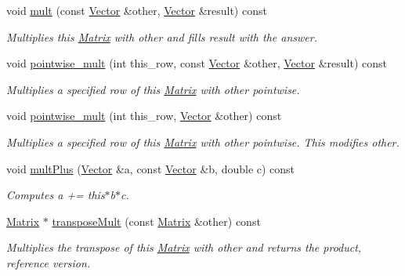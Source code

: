 \begin{DoxyCompactItemize}
void \hyperlink{class_c_a_r_o_m_1_1_matrix_acc2c71fe7bf5f24bb6825aebe07bb0b9}{mult} (const \hyperlink{class_c_a_r_o_m_1_1_vector}{Vector} \&other, \hyperlink{class_c_a_r_o_m_1_1_vector}{Vector} \&result) const 
\begin{DoxyCompactList}\small\item\em Multiplies this \hyperlink{class_c_a_r_o_m_1_1_matrix}{Matrix} with other and fills result with the answer. \end{DoxyCompactList}\item 
void \hyperlink{class_c_a_r_o_m_1_1_matrix_a438765b6451b63759c22b39917c128b1}{pointwise\-\_\-mult} (int this\-\_\-row, const \hyperlink{class_c_a_r_o_m_1_1_vector}{Vector} \&other, \hyperlink{class_c_a_r_o_m_1_1_vector}{Vector} \&result) const 
\begin{DoxyCompactList}\small\item\em Multiplies a specified row of this \hyperlink{class_c_a_r_o_m_1_1_matrix}{Matrix} with other pointwise. \end{DoxyCompactList}\item 
void \hyperlink{class_c_a_r_o_m_1_1_matrix_ac97d136a6747467b84ea9b2b389a823d}{pointwise\-\_\-mult} (int this\-\_\-row, \hyperlink{class_c_a_r_o_m_1_1_vector}{Vector} \&other) const 
\begin{DoxyCompactList}\small\item\em Multiplies a specified row of this \hyperlink{class_c_a_r_o_m_1_1_matrix}{Matrix} with other pointwise. This modifies other. \end{DoxyCompactList}\item 
void \hyperlink{class_c_a_r_o_m_1_1_matrix_aeb6c8e1be7ebeaacaf032d7b00e34bcd}{mult\-Plus} (\hyperlink{class_c_a_r_o_m_1_1_vector}{Vector} \&a, const \hyperlink{class_c_a_r_o_m_1_1_vector}{Vector} \&b, double c) const 
\begin{DoxyCompactList}\small\item\em Computes a += this$\ast$b$\ast$c. \end{DoxyCompactList}\item 
\hyperlink{class_c_a_r_o_m_1_1_matrix}{Matrix} $\ast$ \hyperlink{class_c_a_r_o_m_1_1_matrix_ad0e477b50f0747d5c7d1380e9b609ddd}{transpose\-Mult} (const \hyperlink{class_c_a_r_o_m_1_1_matrix}{Matrix} \&other) const 
\begin{DoxyCompactList}\small\item\em Multiplies the transpose of this \hyperlink{class_c_a_r_o_m_1_1_matrix}{Matrix} with other and returns the product, reference version. \end{DoxyCompactList}\item 

\end{DoxyCompactItemize}
